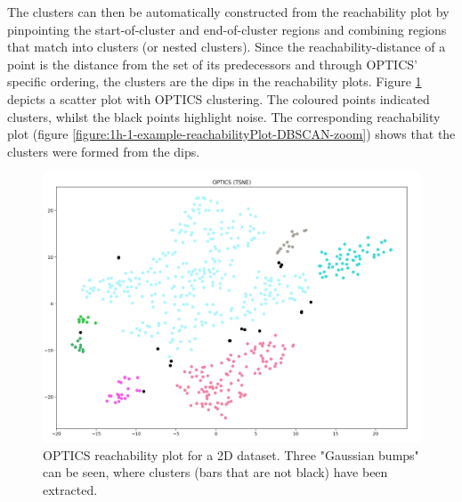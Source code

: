 The clusters can then be automatically constructed from the reachability plot by pinpointing the start-of-cluster and end-of-cluster regions and combining regions that match into clusters (or nested clusters). Since the reachability-distance of a point is the distance from the set of its predecessors and through OPTICS' specific ordering, the clusters are the dips in the reachability plots. Figure \ref{figure:1h-1-example-OPTICS-DBSCAN-zoom} depicts a scatter plot with OPTICS clustering. The coloured points indicated clusters, whilst the black points highlight noise. The corresponding reachability plot (figure \ref{figure:1h-1-example-reachabilityPlot-DBSCAN-zoom}) shows that the clusters were formed from the dips.

\begin{figure}[h]
  \centering
  \includegraphics[width=1\textwidth]{./images/OPTICS/1h-1-example-OPTICS-DBSCAN-zoom.png}
  \caption{OPTICS reachability plot for a 2D dataset. Three "Gaussian bumps" can be seen, where clusters (bars that are not black) have been extracted.}
  \label{figure:1h-1-example-OPTICS-DBSCAN-zoom}
\end{figure}

